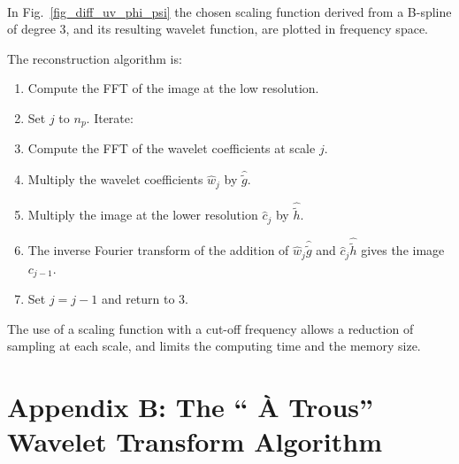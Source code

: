\documentclass[11pt,a4paper]{article}
\begin{document}
\begin{figure*}[htb]
\centerline{
\hbox{
}}
\caption{On the left, the interpolation function $\hat{\phi}$ and, on the 
right, the wavelet  $\hat{\psi}$.}
\label{fig_diff_uv_phi_psi}
\end{figure*}

In Fig.\ \ref{fig_diff_uv_phi_psi} the chosen scaling function 
derived from a B-spline of degree 
3, and its resulting wavelet function, are plotted in frequency space.
 
The reconstruction algorithm is:
\begin{enumerate}
\item Compute  the FFT of the image at the low resolution.
\item Set $j$ to $n_p$. Iterate:
\item Compute the FFT of the wavelet coefficients at scale $j$.
\item Multiply  the wavelet coefficients $\hat{w}_j$ by $\hat{\tilde{g}}$.
\item Multiply   the image at the lower resolution $\hat{c}_j$ by 
$\hat{\tilde{h}}$.
\item The inverse Fourier transform of the addition of  
$\hat{w}_j\hat{\tilde{g}}$ and $\hat{c}_j\hat{\tilde{h}}$ gives the 
image $c_{j-1}$.
\item Set $j = j - 1$ and return to 3.
\end{enumerate}

The use of a scaling function with a cut-off frequency
allows a reduction of sampling at each scale, and limits the  
computing time and the memory size. 


\newpage

\section*{Appendix B: The `` \`A Trous'' Wavelet Transform Algorithm}
\end{document}
